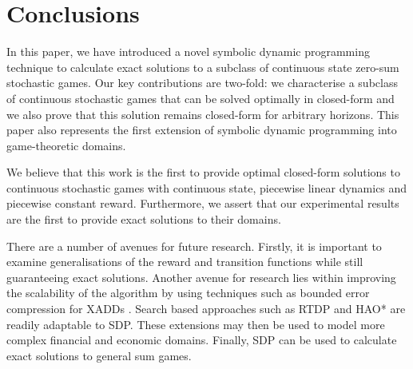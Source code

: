 \section{Conclusions}
\label{sec:conclusion}

In this paper, we have introduced a novel symbolic dynamic programming
technique to calculate exact solutions to a subclass of continuous state
zero-sum stochastic games. Our key contributions are two-fold: we characterise
a subclass of continuous stochastic games that can be solved 
optimally in closed-form and we also prove that this solution remains
closed-form for arbitrary horizons. This paper also represents the first
extension of symbolic dynamic programming into game-theoretic domains.

We believe that this work is the first to provide optimal closed-form
solutions to continuous stochastic games with continuous state, 
piecewise linear dynamics and piecewise constant reward. Furthermore,
we assert that our experimental results are the first to provide
exact solutions to their domains.

There are a number of avenues for future research. Firstly, it is important
to examine generalisations of the reward and transition functions while
still guaranteeing exact solutions. Another avenue for research lies within
improving the scalability of the algorithm by using techniques such as 
bounded error compression for XADDs \cite{Vianna_UAI_2013}. Search based approaches
such as RTDP \cite{Barto_AI_1995} and HAO* \cite{Meuleau_JoAIR_2009}
are readily adaptable to SDP. These extensions may then be used to 
model more complex financial and economic domains. Finally, SDP can be
used to calculate exact solutions to general sum games.
